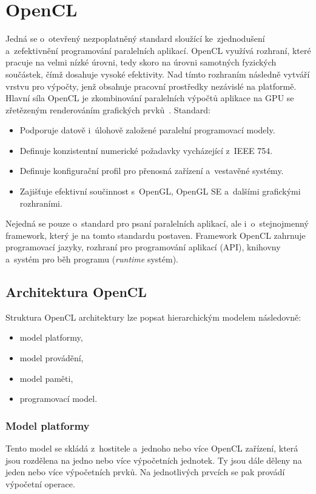 \section{OpenCL}
Jedná se o~otevřený nezpoplatněný standard sloužící ke~zjednodušení a~zefektivnění programování
paralelních aplikací. OpenCL využívá rozhraní, které pracuje na velmi nízké úrovni, tedy skoro na
úrovni samotných fyzických součástek, čímž dosahuje vysoké efektivity. Nad tímto rozhraním následně
vytváří vrstvu pro výpočty, jenž obsahuje pracovní prostředky nezávislé na platformě. Hlavní síla
OpenCL je zkombinování paralelních výpočtů aplikace na GPU se zřetězeným renderováním grafických
prvků~\cite{Khronos:2015}.
Standard:
\begin{itemize}
    \item Podporuje datově i~úlohově založené paralelní programovací modely.
    \item Definuje konzistentní numerické požadavky vycházející z~IEEE 754.
    \item Definuje konfigurační profil pro přenosná zařízení a~vestavěné systémy.
    \item Zajišťuje efektivní součinnost s~OpenGL, OpenGL SE a~dalšími grafickými
        rozhraními.
\end{itemize}
Nejedná se pouze o~standard pro psaní paralelních aplikací, ale i~o~stejnojmenný framework, který
je na tomto standardu postaven. Framework OpenCL zahrnuje programovací jazyky, rozhraní pro
programování aplikací (API), knihovny a~systém pro běh programu ({\it runtime} systém).
\subsection{Architektura OpenCL}
Struktura OpenCL architektury lze popsat hierarchickým modelem následovně:
\begin{itemize}
    \item model platformy,
    \item model provádění,
    \item model paměti,
    \item programovací model.
\end{itemize}

\subsubsection{Model platformy}
Tento model se skládá z~hostitele a~jednoho nebo více OpenCL zařízení, která jsou rozdělena na
jedno nebo více výpočetních jednotek. Ty jsou dále děleny na jeden nebo více výpočetních prvků.
Na jednotlivých prvcích se pak provádí výpočetní operace.

